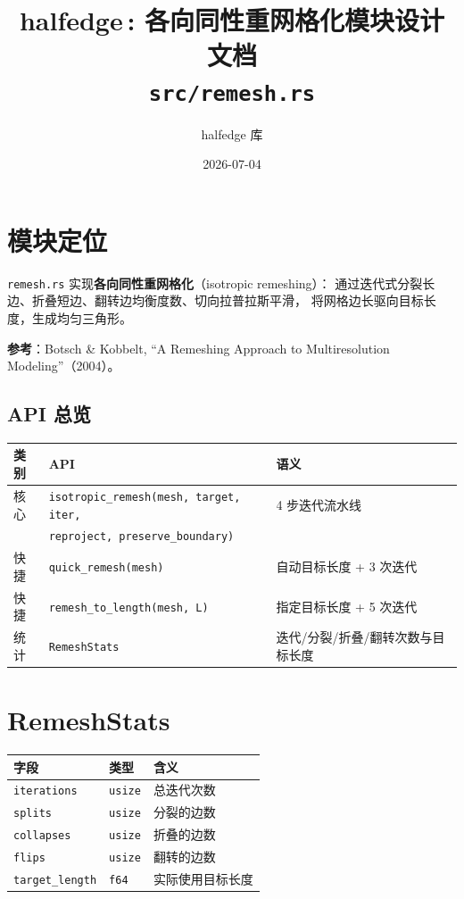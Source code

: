 \documentclass[11pt,a4paper]{article}
\title{\textbf{halfedge\,: 各向同性重网格化模块设计文档} \\ \large \texttt{src/remesh.rs}}
\author{halfedge 库}
\date{2026-07-04}
\begin{document}
\maketitle
\tableofcontents

\section{模块定位}

\texttt{remesh.rs} 实现\textbf{各向同性重网格化}（isotropic remeshing）：
通过迭代式分裂长边、折叠短边、翻转边均衡度数、切向拉普拉斯平滑，
将网格边长驱向目标长度，生成均匀三角形。

\textbf{参考}：Botsch \& Kobbelt, ``A Remeshing Approach to Multiresolution
Modeling''（2004）。

\subsection{API 总览}

\begin{center}
\renewcommand{\arraystretch}{1.18}
\begin{tabular}{@{}lll@{}}
  \toprule
  \textbf{类别} & \textbf{API} & \textbf{语义} \\
  \midrule
  核心   & \texttt{isotropic\_remesh(mesh, target, iter,} & 4 步迭代流水线 \\
         & \texttt{\quad reproject, preserve\_boundary)}  &               \\
  快捷   & \texttt{quick\_remesh(mesh)}                    & 自动目标长度 + 3 次迭代 \\
  快捷   & \texttt{remesh\_to\_length(mesh, L)}            & 指定目标长度 + 5 次迭代 \\
  统计   & \texttt{RemeshStats}                            & 迭代/分裂/折叠/翻转次数与目标长度 \\
  \bottomrule
\end{tabular}
\end{center}

\section{RemeshStats}

\begin{center}
\renewcommand{\arraystretch}{1.18}
\begin{tabular}{@{}lll@{}}
  \toprule
  \textbf{字段} & \textbf{类型} & \textbf{含义} \\
  \midrule
  \texttt{iterations}    & \texttt{usize} & 总迭代次数 \\
  \texttt{splits}        & \texttt{usize} & 分裂的边数 \\
  \texttt{collapses}     & \texttt{usize} & 折叠的边数 \\
  \texttt{flips}         & \texttt{usize} & 翻转的边数 \\
  \texttt{target\_length}& \texttt{f64}   & 实际使用目标长度 \\
  \bottomrule
\end{tabular}
\end{center}
\end{document}
